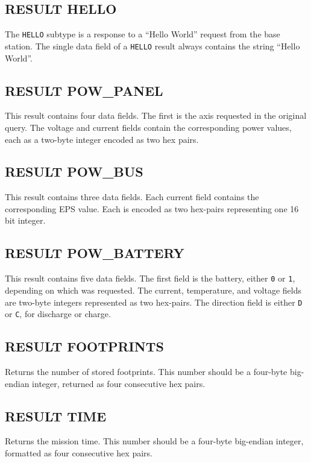 \documentclass{article}
\begin{document}
  \subsection{RESULT HELLO}
    The \texttt{HELLO} subtype is a response to a ``Hello World'' request from the base station.
    The single data field of a \texttt{HELLO} result always contains the string ``Hello World''.

    
  \subsection{RESULT POW\_PANEL}
    This result contains four data fields. The first is the axis requested in the original query.
    The voltage and current fields contain the corresponding power values, each as a two-byte integer encoded as two hex 
    pairs.
    
  \subsection{RESULT POW\_BUS}
    This result contains three data fields. Each current field contains the corresponding EPS value. Each is encoded as
    two hex-pairs representing one 16 bit integer.
    
  \subsection{RESULT POW\_BATTERY}
    This result contains five data fields. The first field is the battery, either \texttt{0} or \texttt{1}, depending
    on which was requested. The current, temperature, and voltage fields are two-byte integers represented as two hex-pairs.
    The direction field is either \texttt{D} or \texttt{C}, for discharge or charge.
    
  \subsection{RESULT FOOTPRINTS}
  Returns the number of stored footprints. This number should be a four-byte big-endian
  integer, returned as four consecutive hex pairs.
  
  \subsection{RESULT TIME}
  Returns the mission time. This number should be a four-byte big-endian integer, 
  formatted as four consecutive hex pairs.
    
\end{document}
